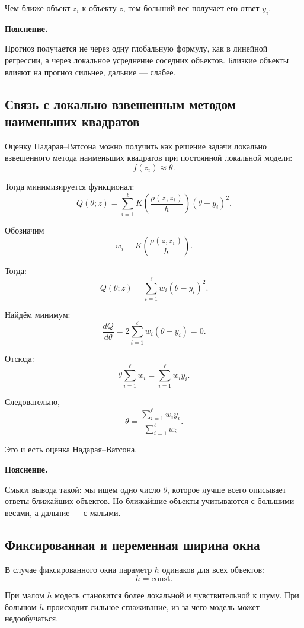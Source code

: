 \documentclass[14pt,a4paper]{extarticle}
\newenvironment{explanation}
{
    \vspace{0.2cm}
    \noindent\textbf{Пояснение.}
}
{
    \vspace{0.2cm}
}
\begin{document}
Чем ближе объект \(z_i\) к объекту \(z\), тем больший вес получает его ответ \(y_i\).

\begin{explanation}
Прогноз получается не через одну глобальную формулу, как в линейной регрессии, а через локальное усреднение соседних объектов. Близкие объекты влияют на прогноз сильнее, дальние — слабее.
\end{explanation}

\subsection{Связь с локально взвешенным методом наименьших квадратов}

Оценку Надарая--Ватсона можно получить как решение задачи локально взвешенного метода наименьших квадратов при постоянной локальной модели:
\[
f(z_i)\approx \theta.
\]

Тогда минимизируется функционал:
\[
Q(\theta;z)
=
\sum_{i=1}^{\ell}
K\left(\frac{\rho(z,z_i)}{h}\right)
(\theta-y_i)^2.
\]

Обозначим
\[
w_i=
K\left(\frac{\rho(z,z_i)}{h}\right).
\]

Тогда:
\[
Q(\theta;z)=\sum_{i=1}^{\ell}w_i(\theta-y_i)^2.
\]

Найдём минимум:
\[
\frac{dQ}{d\theta}
=
2\sum_{i=1}^{\ell}w_i(\theta-y_i)=0.
\]

Отсюда:
\[
\theta \sum_{i=1}^{\ell}w_i
=
\sum_{i=1}^{\ell}w_iy_i.
\]

Следовательно,
\[
\theta=
\frac{\sum_{i=1}^{\ell}w_iy_i}{\sum_{i=1}^{\ell}w_i}.
\]

Это и есть оценка Надарая--Ватсона.

\begin{explanation}
Смысл вывода такой: мы ищем одно число \(\theta\), которое лучше всего описывает ответы ближайших объектов. Но ближайшие объекты учитываются с большими весами, а дальние — с малыми.
\end{explanation}

\subsection{Фиксированная и переменная ширина окна}

В случае фиксированного окна параметр \(h\) одинаков для всех объектов:
\[
h=\text{const}.
\]

При малом \(h\) модель становится более локальной и чувствительной к шуму. При большом \(h\) происходит сильное сглаживание, из-за чего модель может недообучаться.
\end{document}
